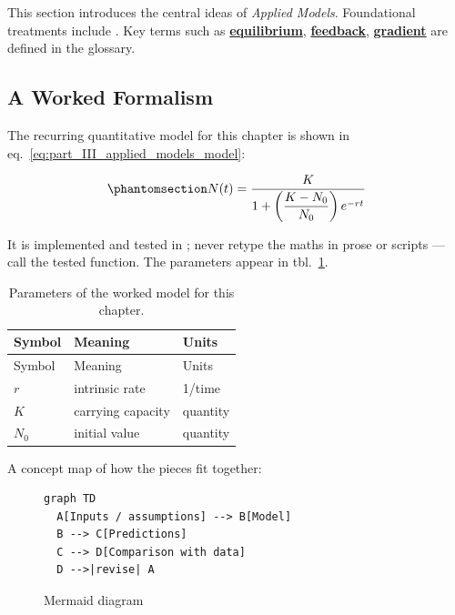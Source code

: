 \documentclass[
]{article}
\theoremstyle{plain}
\theoremstyle{definition}
\begin{document}
This section introduces the central ideas of \emph{Applied Models}.
Foundational treatments include
\citep{patel2018models, nguyen2023synthesis}. Key terms such as
\hyperref[gl:equilibrium]{\textbf{equilibrium}},
\hyperref[gl:feedback]{\textbf{feedback}},
\hyperref[gl:gradient]{\textbf{gradient}} are defined in the glossary.

\subsection{A Worked Formalism}\label{a-worked-formalism-8}

The recurring quantitative model for this chapter is shown in
eq.~\ref{eq:part_III_applied_models_model}:

\begin{equation}\protect\phantomsection\label{eq:part_III_applied_models_model}{ N(t) = \frac{K}{1 + \left(\dfrac{K - N_0}{N_0}\right) e^{-rt}} }\end{equation}

It is implemented and tested in
; never retype the maths in
prose or scripts --- call the tested function. The parameters appear in
tbl.~\ref{tbl:part_III_applied_models_parameters}.

\begin{longtable}[]{@{}lll@{}}
\caption{Parameters of the worked model for this
chapter.}\label{tbl:part_III_applied_models_parameters}\tabularnewline
\toprule\noalign{}
Symbol & Meaning & Units \\
\midrule\noalign{}
\endfirsthead
\toprule\noalign{}
Symbol & Meaning & Units \\
\midrule\noalign{}
\endhead
\bottomrule\noalign{}
\endlastfoot
\(r\) & intrinsic rate & 1/time \\
\(K\) & carrying capacity & quantity \\
\(N_0\) & initial value & quantity \\
\end{longtable}

A concept map of how the pieces fit together:

\begin{figure}[htbp]
\centering
\begin{verbatim}
graph TD
  A[Inputs / assumptions] --> B[Model]
  B --> C[Predictions]
  C --> D[Comparison with data]
  D -->|revise| A
\end{verbatim}
\caption{Mermaid diagram}
\end{figure}
\end{document}
